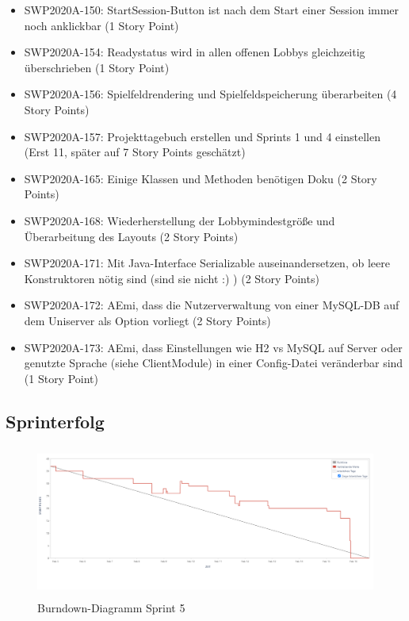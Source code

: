 \documentclass[12pt,a4paper, oneside]{article}
\begin{document}
\begin{itemize}
        \item SWP2020A-150: StartSession-Button ist nach dem Start einer Session immer noch anklickbar (1 Story Point)

        \item SWP2020A-154: Readystatus wird in allen offenen Lobbys gleichzeitig überschrieben    (1 Story Point)

        \item SWP2020A-156: Spielfeldrendering und Spielfeldspeicherung überarbeiten (4 Story Points)

        \item SWP2020A-157: Projekttagebuch erstellen und Sprints 1 und 4 einstellen (Erst 11, später auf 7 Story Points geschätzt)

        \item SWP2020A-165: Einige Klassen und Methoden benötigen Doku (2 Story Points)

        \item SWP2020A-168: Wiederherstellung der Lobbymindestgröße und Überarbeitung des Layouts (2 Story Points)

        \item SWP2020A-171: Mit Java-Interface Serializable auseinandersetzen, ob leere Konstruktoren nötig sind (sind sie nicht :) )    (2 Story Points)

        \item SWP2020A-172: AEmi, dass die Nutzerverwaltung von einer MySQL-DB auf dem Uniserver als Option vorliegt (2 Story Points)

        \item SWP2020A-173: AEmi, dass Einstellungen wie H2 vs MySQL auf Server oder genutzte Sprache (siehe ClientModule) in einer Config-Datei veränderbar sind (1 Story Point)

    \end{itemize}

    \subsection{Sprinterfolg}

    \begin{figure}[h]
        \centering
        \includegraphics[width=\textwidth, height=5cm]{../img/sprint_05/Burndown-Sprint 5.png}
        \caption{Burndown-Diagramm Sprint 5}
        \label{fig: Burndown-Sprint5}
    \end{figure}
\end{document}
